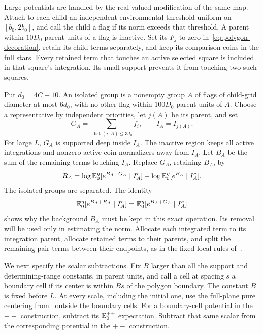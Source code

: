 Large potentials are handled by the real-valued modification of the
same map.  Attach to each child an independent environmental threshold
uniform on $[b_0,2b_0]$, and call the child a flag if its norm exceeds
that threshold.  A parent within $10D_0$ parent units of a flag is
inactive.  Set its $F_j$ to zero in~\eqref{eq:polygon-decoration}, retain
its child terms separately, and keep its comparison coins in the full
stars.  Every retained term that touches an active selected square is
included in that square's integration.  Its small support prevents it
from touching two such squares.

Put $d_0=4C+10$.  An isolated group is a nonempty group $A$ of flags of
child-grid diameter at most $6d_0$, with no other flag within $100D_0$
parent units of $A$.  Choose a representative by independent
priorities, let $j(A)$ be its parent, and set
\[
 G_A=\sum_{\operatorname{dist}(i,A)\le3d_0}f_i,
 \qquad I_A=I_{j(A)}.
\]
For large $L$, $G_A$ is supported deep inside $I_A$.  The inactive region
keeps all active integrations and nonzero active coin normalizers away
from $I_A$.  Let $B_A$ be the sum of the remaining terms touching $I_A$.
Replace $G_A$, retaining $B_A$, by
\begin{equation}\label{eq:polygon-isolated-ratio}
 R_A=\log\mathbb E_0^\eta[e^{B_A+G_A}\mid I_A^c]
       -\log\mathbb E_0^\eta[e^{B_A}\mid I_A^c].
\end{equation}
The isolated groups are separated.  The identity
\begin{equation}\label{eq:polygon-isolated-exactness}
 \mathbb E_0^\eta[e^{B_A+R_A}\mid I_A^c]
 =\mathbb E_0^\eta[e^{B_A+G_A}\mid I_A^c]
\end{equation}
shows why the background $B_A$ must be kept in this exact operation.
Its removal will be used only in estimating the norm.  Allocate each
integrated term to its integration parent, allocate retained terms to
their parents, and split the remaining pair terms between their
endpoints, as in the fixed local rules of~\cite{Q}.

We next specify the scalar subtractions.  Fix $B$ larger than all the
support and determining-range constants, in parent units, and call a
cell at spacing $s$ a boundary cell if its center is within $Bs$ of the
polygon boundary.  The constant $B$ is fixed before $L$.  At every
scale, including the initial one, use the full-plane pure centering
from~\cite{Q} outside the boundary cells.  For a boundary-cell potential
in the $++$ construction, subtract its $\mathbb E_0^{++}$ expectation.  Subtract
that same scalar from the corresponding potential in the $+-$
construction.


